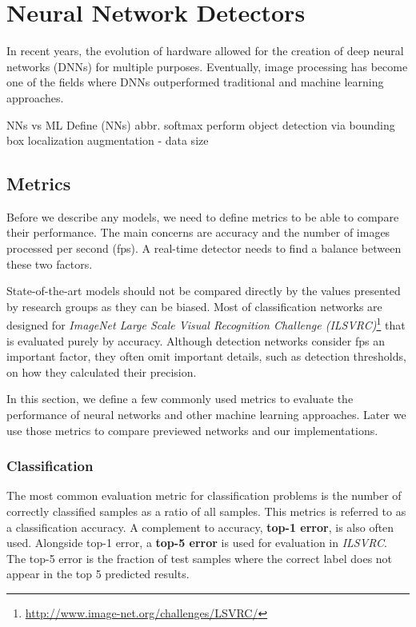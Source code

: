 \chapter{Neural Network Detectors}
In recent years, the evolution of hardware allowed for the creation of deep neural networks (DNNs) for multiple purposes. Eventually, image processing has become one of the fields where DNNs outperformed traditional and machine learning approaches. 

NNs vs ML
Define (NNs) abbr.
softmax
perform object detection via bounding box localization
augmentation - data size

\section{Metrics}
Before we describe any models, we need to define metrics to be able to compare their performance. The main concerns are accuracy and the number of images processed per second (fps). A real-time detector needs to find a balance between these two factors.

State-of-the-art models should not be compared directly by the values presented by research groups as they can be biased. Most of classification networks are designed for \textit{ImageNet Large Scale Visual Recognition Challenge (ILSVRC)}\footnote{\url{http://www.image-net.org/challenges/LSVRC/}} that is evaluated purely by accuracy. Although detection networks consider fps an important factor, they often omit important details, such as detection thresholds, on how they calculated their precision.

In this section, we define a few commonly used metrics to evaluate the performance of neural networks and other machine learning approaches. Later we use those metrics to compare previewed networks and our implementations.

\subsection*{Classification}
The most common evaluation metric for classification problems is the number of correctly classified samples as a ratio of all samples. This metrics is referred to as a classification accuracy. A complement to accuracy, \textbf{top-1 error}, is also often used. Alongside top-1 error, a \textbf{top-5 error} is used for evaluation in \textit{ILSVRC}. The top-5 error is the fraction of test samples where the correct label does not appear in the top 5 predicted results.


